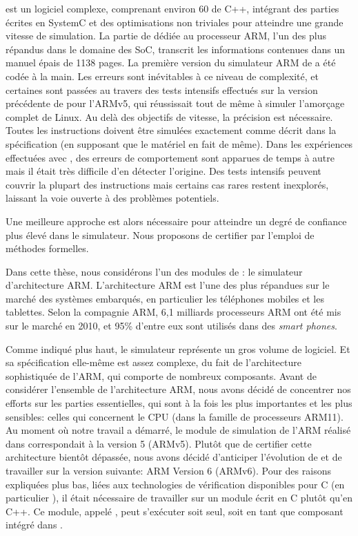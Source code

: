 \simsoc est un logiciel complexe,
comprenant environ 60 de C++,
intégrant des parties écrites en SystemC et
des optimisations non triviales pour atteindre une grande vitesse de simulation.
%
La partie de \simsoc dédiée au processeur ARM,
l'un des plus répandus dans le domaine des SoC,
transcrit les informations contenues
dans un manuel épais de 1138 pages.
La première version du simulateur ARM de \simsoc a été codée à la main.
Les erreurs sont inévitables à ce niveau de complexité,
et certaines sont passées au travers des tests intensifs
effectués sur la version précédente de \simsoc pour l'ARMv5,
qui réussissait tout de même à simuler l'amorçage complet de Linux.
Au delà des objectifs de vitesse,
la précision est nécessaire.
Toutes les instructions doivent être simulées exactement comme décrit
dans la spécification (en supposant que le matériel en fait de même).
Dans les expériences effectuées avec \simsoc, des erreurs de comportement
sont apparues de temps à autre mais il était très difficile 
d'en détecter l'origine. 
Des tests intensifs peuvent couvrir la plupart des instructions
mais certains cas rares restent inexplorés, laissant la voie ouverte
à des problèmes potentiels.

Une meilleure approche est alors nécessaire pour atteindre 
un degré de confiance plus élevé dans le simulateur. 
Nous proposons de certifier \simsoc par l'emploi de méthodes formelles.

Dans cette thèse, nous considérons l'un des modules de \simsoc:
le simulateur d'architecture ARM.
L'architecture ARM est l'une des plus répandues sur le marché
des systèmes embarqués, en particulier les téléphones mobiles et les tablettes.
Selon la compagnie ARM, 6,1 milliards processeurs ARM ont été mis sur le marché en 2010, et 95\:\% d'entre eux sont utilisés dans des \emph{smart phones}.

Comme indiqué plus haut, le simulateur représente un gros volume de logiciel.
Et sa spécification elle-même est assez complexe, 
du fait de l'architecture sophistiquée de l'ARM, 
qui comporte de nombreux composants.
Avant de considérer l'ensemble de l'architecture ARM,
nous avons décidé de concentrer nos efforts 
sur les parties essentielles,
qui sont à la fois les plus importantes et les plus sensibles:
celles qui concernent le CPU (dans la famille de processeurs ARM11).
Au moment où notre travail a démarré, le module de simulation de l'ARM
réalisé dans \simsoc correspondait à la version 5 (ARMv5).
Plutôt que de certifier cette architecture bientôt dépassée,
nous avons décidé d'anticiper l'évolution de \simsoc
et de travailler sur la version suivante: ARM Version 6 (ARMv6).
Pour des raisons expliquées plus bas,
liées aux technologies de vérification disponibles pour C
(en particulier \compcert),
il était nécessaire de travailler sur un module écrit en C plutôt qu'en C++.
Ce module, appelé \simlight, peut s'exécuter soit seul,
soit en tant que composant intégré dans \simsoc.

